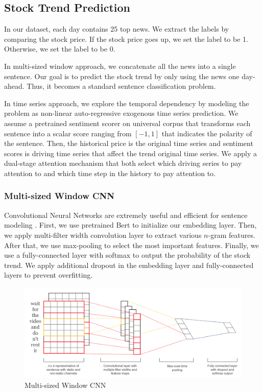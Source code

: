 \documentclass[11pt,a4paper]{article}
\begin{document}
\subsection{Stock Trend Prediction}
In our dataset, each day contains 25 top news. We extract the labels by comparing the stock price. If the stock price goes up, we set the label to be 1. Otherwise, we set the label to be 0.

In multi-sized window approach, we concatenate all the news into a single sentence. Our goal is to predict the stock trend by only using the news one day-ahead. Thus, it becomes a standard sentence classification problem.

In time series approach, we explore the temporal dependency by modeling the problem as non-linear auto-regressive exogenous time series prediction. We assume a pretrained sentiment scorer on universal corpus that transforms each sentence into a scalar score ranging from $[-1, 1]$ that indicates the polarity of the sentence. Then, the historical price is the original time series and sentiment scores is driving time series that affect the trend original time series. We apply a dual-stage attention mechanism that both select which driving series to pay attention to and which time step in the history to pay attention to.

\subsubsection{Multi-sized Window CNN}
Convolutional Neural Networks are extremely useful and efficient for sentence modeling \cite{kim_cnn_sentiment}. First, we use pretrained Bert \cite{bert} to initialize our embedding layer. Then, we apply multi-filter width convolution layer to extract various $n$-gram features. After that, we use max-pooling to select the most important features. Finally, we use a fully-connected layer with softmax to output the probability of the stock trend. We apply additional dropout in the embedding layer and fully-connected layers to prevent overfitting.

\begin{figure}
  \centering
  \includegraphics[width=\linewidth]{multi-size-cnn}
  \caption{Multi-sized Window CNN}
  \label{fig:multi_size_cnn}
\end{figure}
\end{document}
